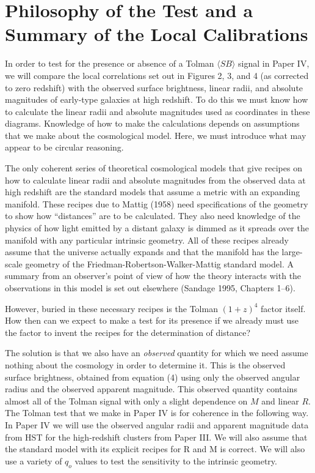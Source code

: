 \documentclass[preprint]{aastex}
\begin{document}
\section{Philosophy of the Test and a Summary of the Local Calibrations}

In order to test for the presence or absence of a Tolman $\langle SB
\rangle$ signal in Paper IV, we will compare the local correlations
set out in Figures 2, 3, and 4 (as corrected to zero redshift) with
the observed surface brightness, linear radii, and absolute magnitudes
of early-type galaxies at high redshift. To do this we must know how
to calculate the linear radii and absolute magnitudes used as
coordinates in these diagrams. Knowledge of how to make the
calculations depends on assumptions that we make about the
cosmological model. Here, we must introduce what may appear to be
circular reasoning.

The only coherent series of theoretical cosmological models that give
recipes on how to calculate linear radii and absolute magnitudes from
the observed data at high redshift are the standard models that assume
a metric with an expanding manifold.  These recipes due to Mattig
(1958) need specifications of the geometry to show how ``distances''
are to be calculated. They also need knowledge of the physics of how
light emitted by a distant galaxy is dimmed as it spreads over the
manifold with any particular intrinsic geometry.  All of these recipes
already assume that the universe actually expands and that the
manifold has the large-scale geometry of the
Friedman-Robertson-Walker-Mattig standard model. A summary from an
observer's point of view of how the theory interacts with the
observations in this model is set out elsewhere (Sandage 1995,
Chapters 1--6).

However, buried in these necessary recipes is the Tolman $(1 + z)^4$
factor itself. How then can we expect to make a test for its presence
if we already must use the factor to invent the recipes for the
determination of distance?  

The solution is that we also have an {\it observed} quantity for which
we need assume nothing about the cosmology in order to determine
it. This is the observed surface brightness, obtained from equation
(4) using only the observed angular radius and the observed apparent
magnitude. This observed quantity contains almost all of the Tolman
signal with only a slight dependence on $M$ and linear $R$. The Tolman
test that we make in Paper IV is for coherence in the following
way. In Paper IV we will use the observed angular radii and apparent
magnitude data from HST for the high-redshift clusters from Paper
III. We will also assume that the standard model with its explicit
recipes for R and M is correct. We will also use a variety of $q_o$
values to test the sensitivity to the intrinsic geometry.
\end{document}
